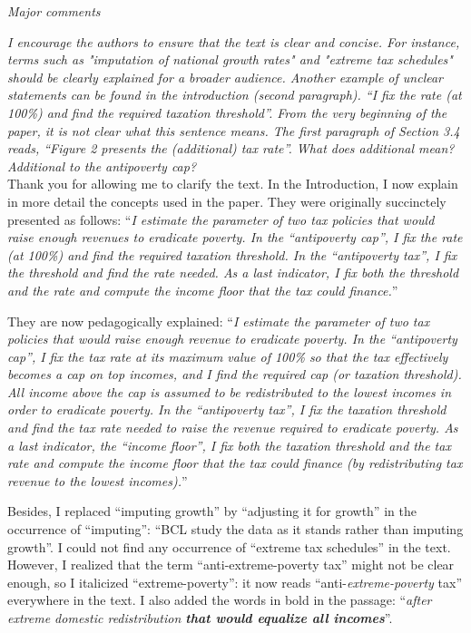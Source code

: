 \documentclass[12pt,english]{article}
\begin{document}
\textit{Major comments}

\textit{I encourage the authors to ensure that the text is clear and concise. For instance, terms such as "imputation of national growth rates" and "extreme tax schedules" should be clearly explained for a broader audience. Another example of unclear statements can be found in the introduction (second paragraph). “I fix the rate (at 100\%) and find the required taxation threshold”. From the very beginning of the paper, it is not clear what this sentence means. The first paragraph of Section 3.4 reads, “Figure 2 presents the (additional) tax rate”. What does additional mean? Additional to the antipoverty cap? }~\\

Thank you for allowing me to clarify the text. In the Introduction, I now explain in more detail the concepts used in the paper. They were originally succinctely presented as follows: ``\textit{I estimate the parameter of two tax policies that would raise enough revenues to eradicate poverty. In the ``antipoverty cap'', I fix the rate (at 100\%) and find the required taxation threshold. In the ``antipoverty tax'', I fix the threshold and find the rate needed. As a last indicator, I fix both the threshold and the rate and compute the income floor that the tax could finance.}'' 

They are now pedagogically explained: ``\textit{I estimate the parameter of two tax policies that would raise enough revenue to eradicate poverty. In the ``antipoverty cap'', I fix the tax rate at its maximum value of 100\% so that the tax effectively becomes a cap on top incomes, and I find the required cap (or taxation threshold). All income above the cap is assumed to be redistributed to the lowest incomes in order to eradicate poverty. In the ``antipoverty tax'', I fix the taxation threshold and find the tax rate needed to raise the revenue required to eradicate poverty. As a last indicator, the ``income floor'', I fix both the taxation threshold and the tax rate and compute the income floor that the tax could finance (by redistributing tax revenue to the lowest incomes).}''

Besides, I replaced ``imputing growth'' by ``adjusting it for growth'' in the occurrence of ``imputing'': ``BCL study the data as it stands rather than imputing growth''. I could not find any occurrence of ``extreme tax schedules'' in the text. However, I realized that the term ``anti-extreme-poverty tax'' might not be clear enough, so I italicized ``extreme-poverty'': it now reads ``anti-\textit{extreme-poverty} tax'' everywhere in the text. I also added the words in bold in the passage: ``\textit{after extreme domestic redistribution \textbf{that would equalize all incomes}}''.
\end{document}
